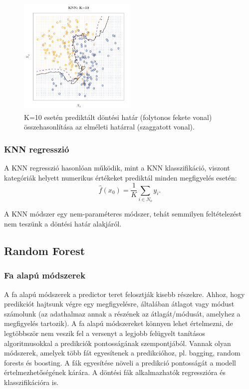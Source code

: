 \documentclass[12pt]{article}
\theoremstyle{plain}
\begin{document}
\begin{figure}
    \begin{center}
    \includegraphics[width=0.5\textwidth]{media/knn3.png}
    \caption{K=10 esetén prediktált döntési határ (folytonos fekete vonal) összehasonlítása az elméleti határral (szaggatott vonal). } 
    \label{fig:knn3}
    \end{center}
\end{figure}

\subsubsection*{KNN regresszió}
A KNN regresszió hasonlóan működik, mint a KNN klasszifikáció, viszont kategóriák helyett numerikus értékeket prediktál minden megfigyelés esetén: $$ \hat{f}(x_0)=\frac{1}{K} \sum_{i \in N_o} y_i.$$ 

A KNN módszer egy nem-paraméteres módszer, tehát semmilyen feltételezést nem teszünk a döntési határ alakjáról. 


\subsection{Random Forest}
\subsubsection{Fa alapú módszerek}
A fa alapú módszerek a predictor teret felosztják kisebb részekre. Ahhoz, hogy predikciót hajtsunk végre egy megfigyelésre, általában átlagot vagy módust számolunk (az adathalmaz annak a részének az átlagát/módusát, amelyhez a megfigyelés tartozik). A fa alapú módszereket könnyen lehet értelmezni, de legtöbbször nem veszik fel a versenyt a legjobb felügyelt tanításos algoritmusokkal a predikciók pontosságának szempontjából. Vannak olyan módszerek, amelyek több fát egyesítenek a predikcióhoz, pl. bagging, random forests és boosting. A fák egyesítése növeli a predikció pontosságát a modell értelmezhetőségének kárára. A döntési fák alkalmazhatók regresszióra és klasszifikációra is. 
\end{document}
